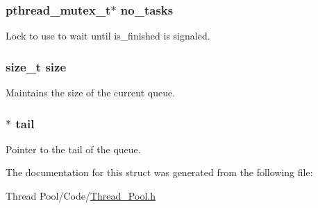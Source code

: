 \subsubsection[{no\+\_\+tasks}]{\setlength{\rightskip}{0pt plus 5cm}pthread\+\_\+mutex\+\_\+t$\ast$ no\+\_\+tasks}\label{struct_task___queue_a82c4f8c176f73a4611cfd93d8182047e}


Lock to use to wait until is\+\_\+finished is signaled. 

\hypertarget{struct_task___queue_a854352f53b148adc24983a58a1866d66}{}
\subsubsection[{size}]{\setlength{\rightskip}{0pt plus 5cm}size\+\_\+t size}\label{struct_task___queue_a854352f53b148adc24983a58a1866d66}


Maintains the size of the current queue. 

\hypertarget{struct_task___queue_a5ecf97d7a2c4b562c68aaf5514691fc1}{}
\subsubsection[{tail}]{$\ast$ tail}\label{struct_task___queue_a5ecf97d7a2c4b562c68aaf5514691fc1}


Pointer to the tail of the queue. 



The documentation for this struct was generated from the following file\+:\begin{DoxyCompactItemize}
\item 
Thread Pool/\+Code/\hyperlink{_thread___pool_8h}{Thread\+\_\+\+Pool.\+h}\end{DoxyCompactItemize}
